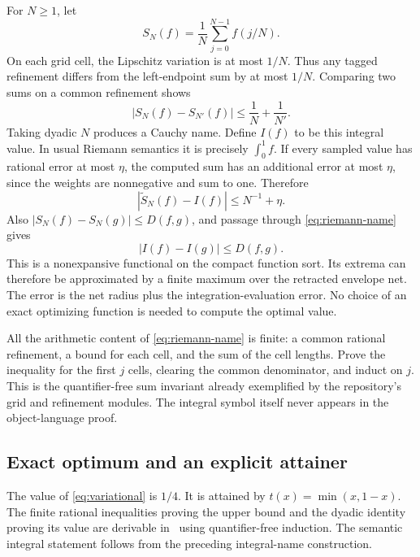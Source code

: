 For \(N\geq1\), let
\[
 S_N(f)=\frac1N\sum_{j=0}^{N-1}f(j/N).
\]
On each grid cell, the Lipschitz variation is at most \(1/N\). Thus any tagged refinement differs from the left-endpoint sum by at most \(1/N\). Comparing two sums on a common refinement shows
\begin{equation}
 |S_N(f)-S_{N'}(f)|\leq\frac1N+\frac1{N'}.
 \label{eq:riemann-name}
\end{equation}
Taking dyadic \(N\) produces a Cauchy name. Define \(I(f)\) to be this integral value. In usual Riemann semantics it is precisely \(\int_0^1f\). If every sampled value has rational error at most \(\eta\), the computed sum has an additional error at most \(\eta\), since the weights are nonnegative and sum to one. Therefore
\begin{equation}
 |\widetilde S_N(f)-I(f)|\leq N^{-1}+\eta.
 \label{eq:integral-error}
\end{equation}
Also \(|S_N(f)-S_N(g)|\leq D(f,g)\), and passage through \eqref{eq:riemann-name} gives
\begin{equation}
 |I(f)-I(g)|\leq D(f,g).
 \label{eq:integral-lip}
\end{equation}
This is a nonexpansive functional on the compact function sort. Its extrema can therefore be approximated by a finite maximum over the retracted envelope net. The error is the net radius plus the integration-evaluation error. No choice of an exact optimizing function is needed to compute the optimal value.

All the arithmetic content of \eqref{eq:riemann-name} is finite: a common rational refinement, a bound for each cell, and the sum of the cell lengths. Prove the inequality for the first \(j\) cells, clearing the common denominator, and induct on \(j\). This is the quantifier-free sum invariant already exemplified by the repository's grid and refinement modules. The integral symbol itself never appears in the object-language proof.

\subsection{Exact optimum and an explicit attainer}

\begin{theorem}\label{thm:tent}
The value of \eqref{eq:variational} is \(1/4\). It is attained by
\(t(x)=\min(x,1-x)\). The finite rational inequalities proving the upper bound and the dyadic identity proving its value are derivable in \ipra\ using quantifier-free induction. The semantic integral statement follows from the preceding integral-name construction.
\end{theorem}

